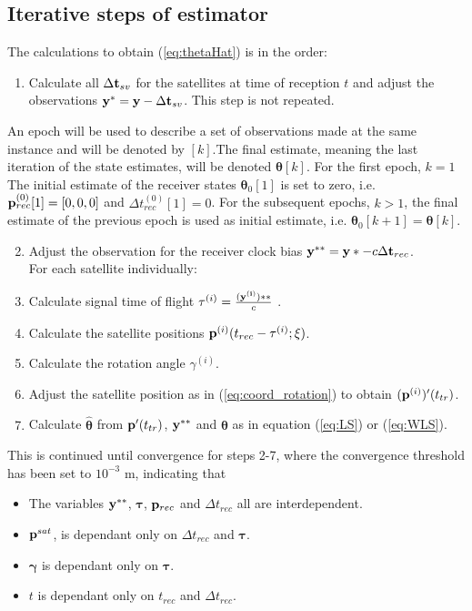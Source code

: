 \subsection{Iterative steps of estimator}\label{iterativeModel}
The calculations to obtain (\ref{eq:thetaHat}) is in the order:
\begin{enumerate}
\item Calculate all $\Delta {\bf t}_{sv}$ for the satellites at time of reception $t$ and adjust the observations ${\bf y}^*= {\bf y} -\Delta {\bf t}_{sv}$. This step is not repeated.
\end{enumerate}
An epoch will be used to describe a set of observations made at the same instance and will be denoted by $[k]$.The final estimate, meaning the last iteration of the state estimates, will be denoted ${\boldsymbol \theta}[k]$. For the first epoch, $k=1$ The initial estimate of the receiver states ${\boldsymbol \theta}_0[1]$ is set to zero, i.e. ${\bf p}^{(0)}_{rec}[1]=[0, 0, 0]$ and $\Delta t^{(0)}_{rec}[1]=0$. For the subsequent epochs, $k>1$, the final estimate of the previous epoch is used as initial estimate, i.e. ${\boldsymbol \theta}_0[k+1]={\boldsymbol \theta}[k]$.
\begin{enumerate}
\setcounter{enumi}{1}
\item Adjust the observation for the receiver clock bias ${\bf y}^{**}={\bf y}*-c\Delta {\bf t}_{rec}$.\\
For each satellite individually:
\item Calculate signal time of flight $\tau^{(i)}=\frac{(\bf y^{(i)})**}{c}$ .
\item Calculate the satellite positions ${\bf p}^{(i)}(t_{rec}-\tau^{(i)};\xi)$.
\item Calculate the rotation angle $\gamma^{(i)}$.
\item Adjust the satellite position as in (\ref{eq:coord_rotation}) to obtain $({\bf p}^{(i)})'(t_{tr})$.
\item Calculate $\hat{{\boldsymbol \theta}}$ from ${\bf p}'(t_{tr})$, $\bf y^{**}$ and $\boldsymbol \theta$ as in equation (\ref{eq:LS}) or (\ref{eq:WLS}). 
\end{enumerate}
This is continued until convergence for steps 2-7, where the convergence threshold has been set to $10^{-3}$ m, indicating that
\begin{itemize}
\item The variables ${\bf y}^{**}$, $\boldsymbol \tau$, ${\bf p}_{rec}$ and $\Delta t_{rec}$ all are interdependent.
\item ${\bf p}^{sat}$, is dependant only on $\Delta t_{rec}$ and $\boldsymbol \tau$. 
\item $\boldsymbol \gamma$ is dependant only on $\boldsymbol \tau$.
\item $t$ is dependant only on $t_{rec}$ and $\Delta t_{rec}$.
\end{itemize}

